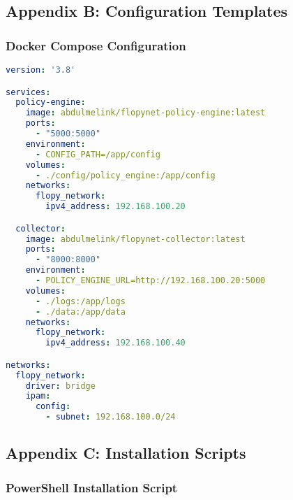 \documentclass[12pt,a4paper,twoside]{article}
\begin{document}
\subsection{Appendix B: Configuration Templates}

\subsubsection{Docker Compose Configuration}

\begin{lstlisting}[language=yaml, caption=Docker Compose Template]
version: '3.8'

services:
  policy-engine:
    image: abdulmelink/flopynet-policy-engine:latest
    ports:
      - "5000:5000"
    environment:
      - CONFIG_PATH=/app/config
    volumes:
      - ./config/policy_engine:/app/config
    networks:
      flopy_network:
        ipv4_address: 192.168.100.20

  collector:
    image: abdulmelink/flopynet-collector:latest
    ports:
      - "8000:8000"
    environment:
      - POLICY_ENGINE_URL=http://192.168.100.20:5000
    volumes:
      - ./logs:/app/logs
      - ./data:/app/data
    networks:
      flopy_network:
        ipv4_address: 192.168.100.40

networks:
  flopy_network:
    driver: bridge
    ipam:
      config:
        - subnet: 192.168.100.0/24
\end{lstlisting}

\subsection{Appendix C: Installation Scripts}

\subsubsection{PowerShell Installation Script}
\end{document}
